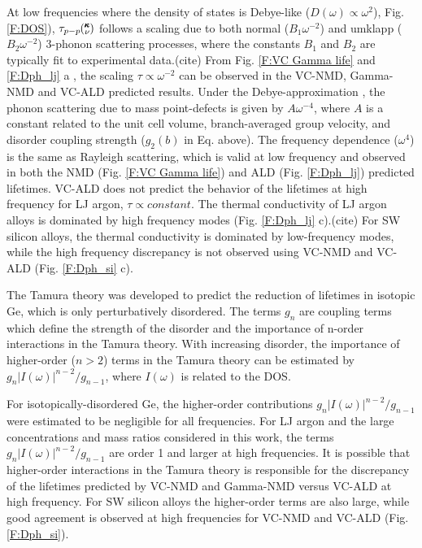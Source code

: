 \documentclass[aps,prb,onecolumn,preprint,superscriptaddress,amsmath,amssymb,floatfix]{revtex4}
\newcommand{\kv}{\mspace{-4.0mu}\left(\mspace{-8.0mu}
\begin{smallmatrix}&\pmb{\kappa} \\&\nu\end{smallmatrix}
\mspace{-3.0mu}\right)}
\begin{document}
At low frequencies where the density of states is Debye-like 
($D(\omega) \propto \omega^{2}$), Fig. \ref{F:DOS}), 
$\tau_{p-p}\kv$ follows a scaling due to both normal ($B_1\omega^{-2}$) 
and umklapp ($B_2\omega^{-2}$) 3-phonon scattering processes, where the 
constants $B_1$ and $B_2$ are typically fit to experimental data.(cite) 
From Fig. \ref{F:VC Gamma life} and \ref{F:Dph_lj} a , 
the scaling $\tau \propto \omega^{-2}$ can be 
observed  
in the VC-NMD, Gamma-NMD and VC-ALD predicted results. 
Under the Debye-approximation , 
the phonon scattering due to mass point-defects 
is given by $A\omega^{-4}$, where $A$ is a constant related to the unit 
cell volume, branch-averaged group velocity, and disorder coupling strength 
($g_2(b)$ in Eq. above). 
The frequency dependence ($\omega^4$) is the same as 
Rayleigh scattering, which is valid at low frequency and observed 
in both the NMD (Fig. \ref{F:VC Gamma life}) and ALD 
(Fig. \ref{F:Dph_lj}) predicted lifetimes. 
VC-ALD does not predict the behavior of the lifetimes at high frequency 
for LJ argon, $\tau \propto constant$. The thermal conductivity of 
LJ argon alloys is dominated by high frequency modes 
(Fig. \ref{F:Dph_lj} c).(cite)  
For SW silicon alloys, the thermal conductivity is dominated by 
low-frequency modes, while the high frequency discrepancy is 
not observed using VC-NMD and VC-ALD (Fig. \ref{F:Dph_si} c). 

The Tamura theory was developed to predict the reduction of lifetimes 
in isotopic Ge, which is only perturbatively disordered. 
The terms $g_n$ are  
coupling terms which define the strength of the disorder and the 
importance of n-order interactions in the Tamura theory.  
With increasing disorder, 
the importance of higher-order ($n > 2$) terms in the 
Tamura theory can be estimated by $g_n|I(\omega)|^{n-2}/g_{n-1}$, 
where $I(\omega)$ is related to the DOS.\cite{tamura_isotope_1983} 

For isotopically-disordered Ge, the higher-order contributions 
$g_n|I(\omega)|^{n-2}/g_{n-1}$ were estimated to be negligible for all 
frequencies.\cite{tamura_isotope_1983} 
For LJ argon and the large concentrations and mass ratios considered 
in this work, the terms 
$g_n|I(\omega)|^{n-2}/g_{n-1}$ are order 1 and larger at high 
frequencies. It is possible that 
higher-order interactions in the Tamura theory 
is responsible for the 
discrepancy of the lifetimes predicted by VC-NMD and Gamma-NMD 
versus VC-ALD at high frequency.
For SW silicon alloys the higher-order terms are also large, while 
good agreement is observed at high frequencies for VC-NMD and VC-ALD 
(Fig. \ref{F:Dph_si}).
\end{document}
